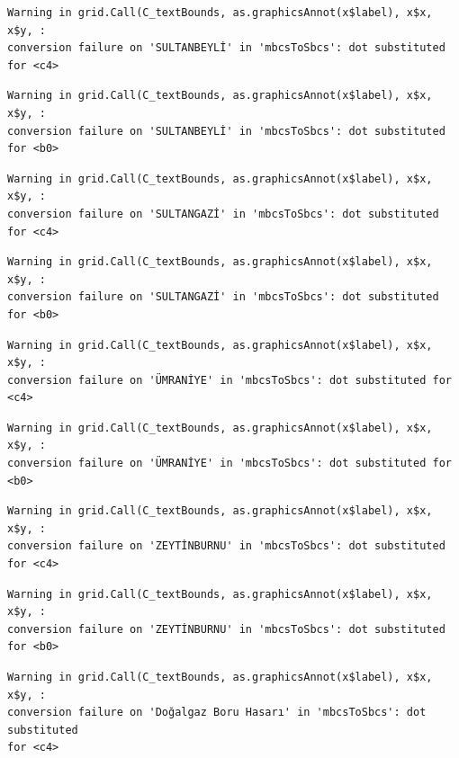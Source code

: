 \documentclass[
  11pt,
  a4paper,
  DIV=11,
  numbers=noendperiod]{scrartcl}
\begin{document}
\begin{verbatim}
Warning in grid.Call(C_textBounds, as.graphicsAnnot(x$label), x$x, x$y, :
conversion failure on 'SULTANBEYLİ' in 'mbcsToSbcs': dot substituted for <c4>
\end{verbatim}

\begin{verbatim}
Warning in grid.Call(C_textBounds, as.graphicsAnnot(x$label), x$x, x$y, :
conversion failure on 'SULTANBEYLİ' in 'mbcsToSbcs': dot substituted for <b0>
\end{verbatim}

\begin{verbatim}
Warning in grid.Call(C_textBounds, as.graphicsAnnot(x$label), x$x, x$y, :
conversion failure on 'SULTANGAZİ' in 'mbcsToSbcs': dot substituted for <c4>
\end{verbatim}

\begin{verbatim}
Warning in grid.Call(C_textBounds, as.graphicsAnnot(x$label), x$x, x$y, :
conversion failure on 'SULTANGAZİ' in 'mbcsToSbcs': dot substituted for <b0>
\end{verbatim}

\begin{verbatim}
Warning in grid.Call(C_textBounds, as.graphicsAnnot(x$label), x$x, x$y, :
conversion failure on 'ÜMRANİYE' in 'mbcsToSbcs': dot substituted for <c4>
\end{verbatim}

\begin{verbatim}
Warning in grid.Call(C_textBounds, as.graphicsAnnot(x$label), x$x, x$y, :
conversion failure on 'ÜMRANİYE' in 'mbcsToSbcs': dot substituted for <b0>
\end{verbatim}

\begin{verbatim}
Warning in grid.Call(C_textBounds, as.graphicsAnnot(x$label), x$x, x$y, :
conversion failure on 'ZEYTİNBURNU' in 'mbcsToSbcs': dot substituted for <c4>
\end{verbatim}

\begin{verbatim}
Warning in grid.Call(C_textBounds, as.graphicsAnnot(x$label), x$x, x$y, :
conversion failure on 'ZEYTİNBURNU' in 'mbcsToSbcs': dot substituted for <b0>
\end{verbatim}

\begin{verbatim}
Warning in grid.Call(C_textBounds, as.graphicsAnnot(x$label), x$x, x$y, :
conversion failure on 'Doğalgaz Boru Hasarı' in 'mbcsToSbcs': dot substituted
for <c4>
\end{verbatim}
\end{document}
